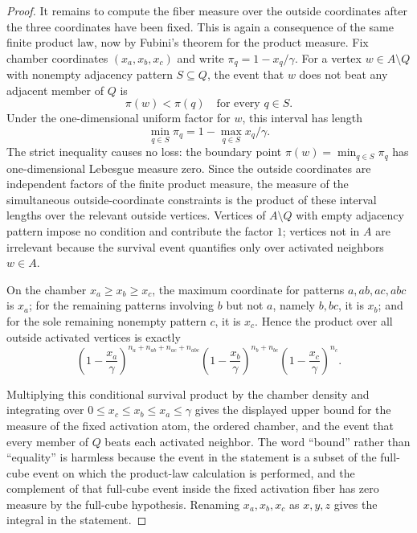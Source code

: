 \begin{proof}
It remains to compute the fiber measure over the outside coordinates after
the three coordinates have been fixed.  This is again a consequence of the
same finite product law, now by Fubini's theorem for the product measure.
Fix chamber coordinates $(x_a,x_b,x_c)$ and write
$\pi_q=1-x_q/\gamma$.  For a vertex $w\in A\setminus Q$ with nonempty
adjacency pattern $S\subseteq Q$, the event that $w$ does not beat any adjacent
member of $Q$ is
\[
\pi(w)<\pi(q)\quad\text{for every }q\in S .
\]
Under the one-dimensional uniform factor for $w$, this interval has length
\[
\min_{q\in S}\pi_q
=1-\max_{q\in S}x_q/\gamma .
\]
The strict inequality causes no loss: the boundary point
$\pi(w)=\min_{q\in S}\pi_q$ has one-dimensional Lebesgue measure zero.  Since
the outside coordinates are independent factors of the finite product
measure, the measure of the simultaneous outside-coordinate constraints is
the product of these interval lengths over the relevant outside vertices.
Vertices of $A\setminus Q$ with empty adjacency pattern impose no condition
and contribute the factor $1$; vertices not in $A$ are irrelevant because the
survival event quantifies only over activated neighbors $w\in A$.

On the chamber $x_a\ge x_b\ge x_c$, the maximum coordinate for patterns
$a,ab,ac,abc$ is $x_a$; for the remaining patterns involving $b$ but not $a$,
namely $b,bc$, it is $x_b$; and for the sole remaining nonempty pattern
$c$, it is $x_c$.  Hence the product over all outside activated vertices is
exactly
\[
\left(1-\frac{x_a}{\gamma}\right)^{n_a+n_{ab}+n_{ac}+n_{abc}}
\left(1-\frac{x_b}{\gamma}\right)^{n_b+n_{bc}}
\left(1-\frac{x_c}{\gamma}\right)^{n_c}.
\]

Multiplying this conditional survival product by the chamber density and
integrating over $0\le x_c\le x_b\le x_a\le\gamma$ gives the displayed upper
bound for the measure of the fixed activation atom, the ordered chamber, and
the event that every member of $Q$ beats each activated neighbor.  The word
``bound'' rather than ``equality'' is harmless because the event in the
statement is a subset of the full-cube event on which the product-law
calculation is performed, and the complement of that full-cube event inside
the fixed activation fiber has zero measure by the full-cube hypothesis.
Renaming $x_a,x_b,x_c$ as $x,y,z$ gives the integral in the statement.
\end{proof}
